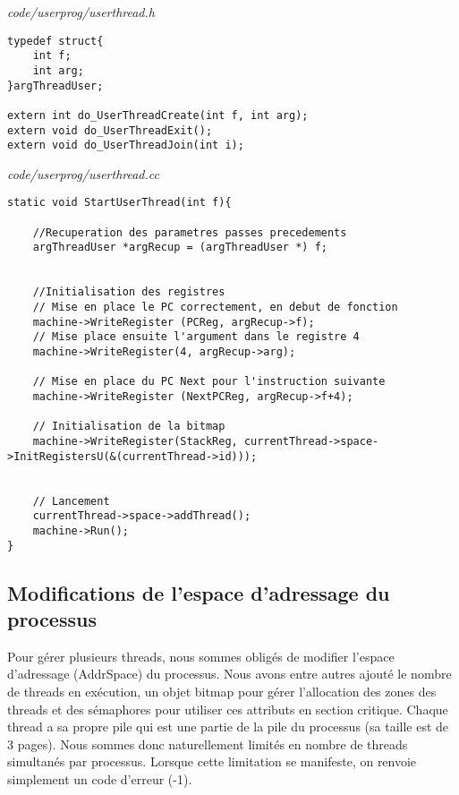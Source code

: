 \documentclass[a4paper,10pt]{article}
\begin{document}
\textit{code/userprog/userthread.h}
\begin{lstlisting}
typedef struct{
	int f;
	int arg;
}argThreadUser;

extern int do_UserThreadCreate(int f, int arg);
extern void do_UserThreadExit();
extern void do_UserThreadJoin(int i);
\end{lstlisting}

\textit{code/userprog/userthread.cc}
\begin{lstlisting}
static void StartUserThread(int f){

  	//Recuperation des parametres passes precedements
  	argThreadUser *argRecup = (argThreadUser *) f;


    //Initialisation des registres
    // Mise en place le PC correctement, en debut de fonction
    machine->WriteRegister (PCReg, argRecup->f);
    // Mise place ensuite l'argument dans le registre 4
    machine->WriteRegister(4, argRecup->arg);
    
    // Mise en place du PC Next pour l'instruction suivante
    machine->WriteRegister (NextPCReg, argRecup->f+4);

    // Initialisation de la bitmap 
	machine->WriteRegister(StackReg, currentThread->space->InitRegistersU(&(currentThread->id)));
  	

    // Lancement 
    currentThread->space->addThread();
    machine->Run();
}
\end{lstlisting}

\subsection{Modifications de l'espace d'adressage du processus}

Pour gérer plusieurs threads, nous sommes obligés de modifier l'espace
d'adressage (AddrSpace) du processus. Nous avons entre autres ajouté le nombre
de threads en exécution, un objet bitmap pour gérer l'allocation des
zones des threads et des sémaphores pour utiliser ces attributs en section
critique. Chaque thread a sa propre pile qui est une partie de la pile du
processus (sa taille est de 3 pages). Nous sommes donc naturellement limités en
nombre de threads simultanés par processus. Lorsque cette limitation
se manifeste, on renvoie simplement un code d'erreur (-1).
\end{document}
